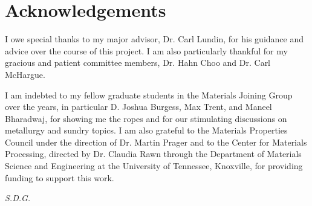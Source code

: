 \chapter*{Acknowledgements}
I owe special thanks to my major advisor, Dr. Carl Lundin, for his guidance and advice over the course of this project. I am also particularly thankful for my gracious and patient committee members, Dr. Hahn Choo and Dr. Carl McHargue. 

I am indebted to my fellow graduate students in the Materials Joining Group over the years, in particular D. Joshua Burgess, Max Trent, and Maneel Bharadwaj, for showing me the ropes and for our stimulating discussions on metallurgy and sundry topics. I am also grateful to the Materials Properties Council under the direction of Dr. Martin Prager and to the Center for Materials Processing, directed by Dr. Claudia Rawn through the Department of Materials Science and Engineering at the University of Tennessee, Knoxville, for providing funding to support this work.

\vfill
\centerline{\emph{S.D.G.}}